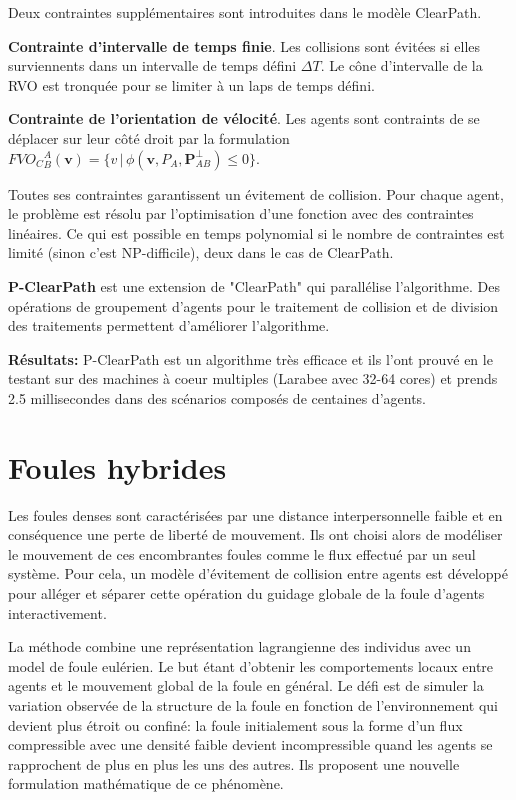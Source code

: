 \documentclass[11pt]{article}
\begin{document}
Deux contraintes supplémentaires sont introduites dans le modèle ClearPath. 

\textbf{Contrainte d'intervalle de temps finie}. Les collisions sont évitées si elles surviennents dans un intervalle de temps défini $\Delta T$. Le cône d'intervalle de la RVO est tronquée pour se limiter à un laps de temps défini.

\textbf{Contrainte de l'orientation de vélocité}. Les agents sont contraints de se déplacer sur leur côté droit par la formulation $FVO_C{}_B^A(\textbf{v}) = \{v \,|\, \phi(\textbf{v}, P_A, \textbf{P}_{AB}^\perp) \leq 0\}$.

Toutes ses contraintes garantissent un évitement de collision. Pour chaque agent, le problème est résolu par l'optimisation d'une fonction avec des contraintes linéaires. Ce qui est possible en temps polynomial si le nombre de contraintes est limité (sinon c'est NP-difficile), deux dans le cas de ClearPath.

\textbf{P-ClearPath} est une extension de "ClearPath" qui parallélise l'algorithme. Des opérations de groupement d'agents pour le traitement de collision et de division des traitements permettent d'améliorer l'algorithme. 

\textbf{Résultats:} P-ClearPath est un algorithme très efficace et ils l'ont prouvé en le testant sur des machines à coeur multiples (Larabee avec 32-64 cores) et prends 2.5 millisecondes dans des scénarios composés de centaines d'agents.

\section{Foules hybrides}

Les foules denses sont caractérisées par une distance interpersonnelle faible et en conséquence une perte de liberté de mouvement. Ils ont choisi alors de modéliser le mouvement de ces encombrantes foules comme le flux effectué par un seul système. Pour cela, un modèle d'évitement de collision entre agents est développé pour alléger et séparer cette opération du guidage globale de la foule d'agents interactivement.

La méthode combine une représentation lagrangienne des individus avec un model de foule eulérien. Le but étant d'obtenir les comportements locaux entre agents et le mouvement global de la foule en général. Le défi est de simuler la variation observée de la structure de la foule en fonction de l'environnement qui devient plus étroit ou confiné: la foule initialement sous la forme d'un flux compressible avec une densité faible devient incompressible quand les agents se rapprochent de plus en plus les uns des autres. Ils proposent une nouvelle formulation mathématique de ce phénomène.
\end{document}
